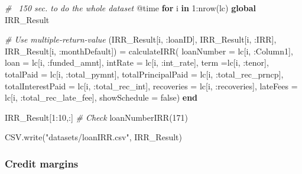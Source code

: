 \documentclass[11pt,]{report}
\newenvironment{Shaded}{\begin{snugshade}}{\end{snugshade}}
\newcommand{\CommentTok}[1]{\textcolor[rgb]{0.56,0.35,0.01}{\textit{#1}}}
\newcommand{\FloatTok}[1]{\textcolor[rgb]{0.00,0.00,0.81}{#1}}
\newcommand{\KeywordTok}[1]{\textcolor[rgb]{0.13,0.29,0.53}{\textbf{#1}}}
\newcommand{\NormalTok}[1]{#1}
\newcommand{\StringTok}[1]{\textcolor[rgb]{0.31,0.60,0.02}{#1}}
\begin{document}
\begin{Shaded}
\begin{Highlighting}[numbers=left,,]
\CommentTok{# ~150 sec. to do the whole dataset}
\NormalTok{@time }\KeywordTok{for}\NormalTok{ i }\KeywordTok{in} \FloatTok{1}\NormalTok{:nrow(lc)}
  \KeywordTok{global}\NormalTok{ IRR_Result}

  \CommentTok{# Use multiple-return-value}
\NormalTok{  (IRR_Result[i, :loanID], IRR_Result[i, :IRR], IRR_Result[i, :monthDefault]) =}
\NormalTok{      calculateIRR(}
\NormalTok{          loanNumber = lc[i, :Column1],}
\NormalTok{          loan = lc[i, :funded_amnt], intRate = lc[i, :int_rate], term =lc[i, :tenor],}
\NormalTok{          totalPaid = lc[i, :total_pymnt], totalPrincipalPaid = lc[i, :total_rec_prncp],}
\NormalTok{          totalInterestPaid = lc[i, :total_rec_int],}
\NormalTok{          recoveries = lc[i, :recoveries], lateFees = lc[i, :total_rec_late_fee],}
\NormalTok{          showSchedule = false)}
\KeywordTok{end}


\NormalTok{IRR_Result[}\FloatTok{1}\NormalTok{:}\FloatTok{10}\NormalTok{,:]}
\CommentTok{# Check}
\NormalTok{loanNumberIRR(}\FloatTok{171}\NormalTok{)}

\NormalTok{CSV.write(}\StringTok{"datasets/loanIRR.csv"}\NormalTok{, IRR_Result)}
\end{Highlighting}
\end{Shaded}

\hypertarget{credit-margins}{%
\subsubsection{Credit margins}\label{credit-margins}}
\end{document}
